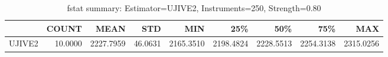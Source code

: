 \begin{table}[ht]
\centering
\caption{fstat summary: Estimator=UJIVE2, Instruments=250, Strength=0.80}
\begin{tabular}{lrrrrrrrr}
\toprule
 & COUNT & MEAN & STD & MIN & 25\% & 50\% & 75\% & MAX \\
\midrule
UJIVE2 & 10.0000 & 2227.7959 & 46.0631 & 2165.3510 & 2198.4824 & 2228.5513 & 2254.3138 & 2315.0256 \\
\bottomrule
\end{tabular}
\end{table}
